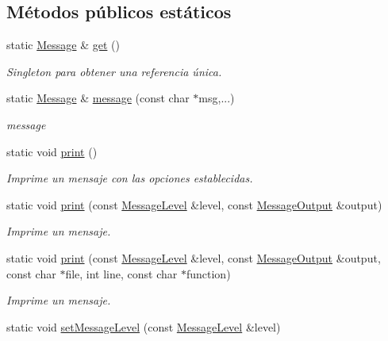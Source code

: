 \subsection*{Métodos públicos estáticos}
\begin{DoxyCompactItemize}
\item 
static \hyperlink{class_i3_d_1_1_message}{Message} \& \hyperlink{class_i3_d_1_1_message_a4e67294cda784d09467939c4a580cf18}{get} ()
\begin{DoxyCompactList}\small\item\em Singleton para obtener una referencia única. \end{DoxyCompactList}\item 
static \hyperlink{class_i3_d_1_1_message}{Message} \& \hyperlink{class_i3_d_1_1_message_a525f877a41a1e7493188b2b720d1d254}{message} (const char $\ast$msg,...)
\begin{DoxyCompactList}\small\item\em message \end{DoxyCompactList}\item 
static void \hyperlink{class_i3_d_1_1_message_a414c9296d819d4ea29cbcb8719d1af2a}{print} ()
\begin{DoxyCompactList}\small\item\em Imprime un mensaje con las opciones establecidas. \end{DoxyCompactList}\item 
static void \hyperlink{class_i3_d_1_1_message_abcbe6bb4eaedadfc2a293bc30199b154}{print} (const \hyperlink{namespace_i3_d_a994cd716e000a4023e180dcdb9b3a9c0}{Message\+Level} \&level, const \hyperlink{namespace_i3_d_accba1eafa248ca79da818a0b72e60964}{Message\+Output} \&output)
\begin{DoxyCompactList}\small\item\em Imprime un mensaje. \end{DoxyCompactList}\item 
static void \hyperlink{class_i3_d_1_1_message_a35685ab8b54377a7846917cf065288cf}{print} (const \hyperlink{namespace_i3_d_a994cd716e000a4023e180dcdb9b3a9c0}{Message\+Level} \&level, const \hyperlink{namespace_i3_d_accba1eafa248ca79da818a0b72e60964}{Message\+Output} \&output, const char $\ast$file, int line, const char $\ast$function)
\begin{DoxyCompactList}\small\item\em Imprime un mensaje. \end{DoxyCompactList}\item 
static void \hyperlink{class_i3_d_1_1_message_a05802b639ffc072d4921757a7f494fad}{set\+Message\+Level} (const \hyperlink{namespace_i3_d_a994cd716e000a4023e180dcdb9b3a9c0}{Message\+Level} \&level)

\end{DoxyCompactItemize}
